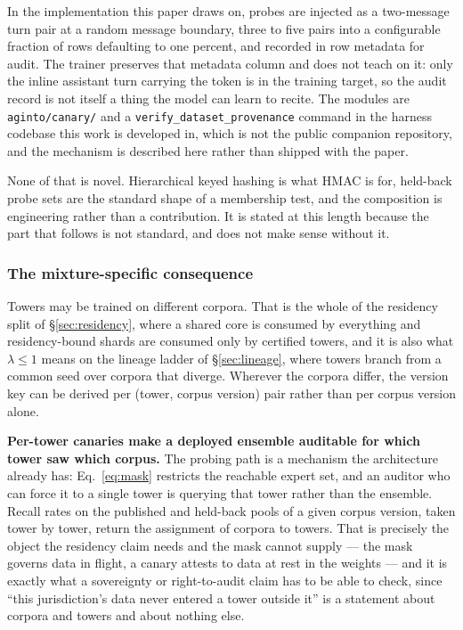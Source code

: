 \documentclass[11pt]{article}
\begin{document}
In the implementation this paper draws on, probes are injected as a two-message turn pair at a random message boundary, three to five pairs into a configurable fraction of rows defaulting to one percent, and recorded in row metadata for audit. The trainer preserves that metadata column and does not teach on it: only the inline assistant turn carrying the token is in the training target, so the audit record is not itself a thing the model can learn to recite. The modules are \texttt{aginto/canary/} and a \texttt{verify\_dataset\_provenance} command in the harness codebase this work is developed in, which is not the public companion repository, and the mechanism is described here rather than shipped with the paper.

None of that is novel. Hierarchical keyed hashing is what HMAC is for, held-back probe sets are the standard shape of a membership test, and the composition is engineering rather than a contribution. It is stated at this length because the part that follows is not standard, and does not make sense without it.

\subsubsection*{The mixture-specific consequence}

Towers may be trained on different corpora. That is the whole of the residency split of \S\ref{sec:residency}, where a shared core is consumed by everything and residency-bound shards are consumed only by certified towers, and it is also what $\lambda \leq 1$ means on the lineage ladder of \S\ref{sec:lineage}, where towers branch from a common seed over corpora that diverge. Wherever the corpora differ, the version key can be derived per (tower, corpus version) pair rather than per corpus version alone.

\textbf{Per-tower canaries make a deployed ensemble auditable for which tower saw which corpus.} The probing path is a mechanism the architecture already has: Eq.~\eqref{eq:mask} restricts the reachable expert set, and an auditor who can force it to a single tower is querying that tower rather than the ensemble. Recall rates on the published and held-back pools of a given corpus version, taken tower by tower, return the assignment of corpora to towers. That is precisely the object the residency claim needs and the mask cannot supply --- the mask governs data in flight, a canary attests to data at rest in the weights --- and it is exactly what a sovereignty or right-to-audit claim has to be able to check, since ``this jurisdiction's data never entered a tower outside it'' is a statement about corpora and towers and about nothing else.
\end{document}
